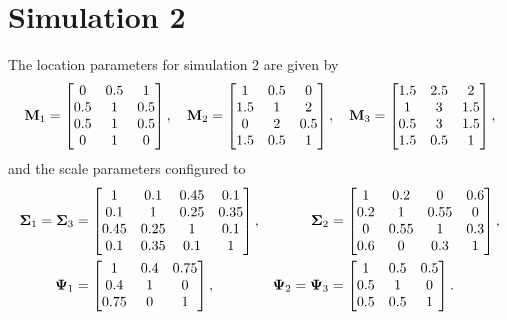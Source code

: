 \documentclass[12pt]{report}
\begin{document}
\section{Simulation 2}
The location parameters for simulation 2 are given by
$$
{\bf M}_1 =
\begin{bmatrix} 
0  &  0.5 & 1   \\
0.5 & 1 &  0.5 \\
0.5 & 1 &  0.5 \\
 0 & 1 & 0
\end{bmatrix}, \quad 
{\bf M}_2=
\begin{bmatrix} 
1 &  0.5 & 0   \\
1.5 & 1 &  2 \\
0 & 2 &  0.5 \\
 1.5 & 0.5 & 1
\end{bmatrix},
\quad 
{\bf M}_3=
\begin{bmatrix} 
1.5 &  2.5 & 2   \\
1 & 3 &  1.5 \\
0.5 & 3 &  1.5 \\
 1.5 & 0.5 & 1
\end{bmatrix},
$$
and the scale parameters configured to
\begin{align*}
{\bf \Sigma}_1 = {\bf \Sigma}_3 &=
\begin{bmatrix} 
1 &     0.1&     0.45&        0.1\\
                0.1&     1&     0.25&    0.35\\
                0.45&       0.25&     1&     0.1\\
                0.1&      0.35&       0.1&       1\\
\end{bmatrix},&  
{\bf \Sigma}_2 &=
\begin{bmatrix} 
      1  &      0.2 &     0  & 0.6 \\
      0.2 &       1 &       0.55      & 0\\
      0 &        0.55  &   1      & 0.3\\
   0.6 &       0  &             0.3     & 1
\end{bmatrix},
\\
{\bf \Psi}_1 &=
\begin{bmatrix} 
1  &  0.4 & 0.75   \\
0.4 & 1 &  0\\
 0.75 & 0  & 1 
\end{bmatrix},  &
{\bf \Psi}_2= {\bf \Psi}_3 &= 
\begin{bmatrix} 
1  &  0.5 & 0.5   \\
0.5 & 1 &  0\\
 0.5 & 0.5  & 1 
\end{bmatrix}.
\end{align*}
\end{document}
